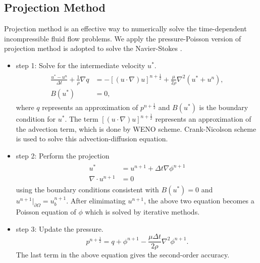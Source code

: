 \subsection{Projection Method}
Projection method is an effective way to numerically solve the time-dependent 
incompressible fluid flow problems. 
We apply the pressure-Poisson version of projection method 
\cite{Chorin68, KimMoin85, Brown2001accurate} is adopted to solve the 
Navier-Stokes . 
\begin{itemize}
\item step 1: Solve for the intermediate velocity $u^*$.
    \begin{eqnarray}
    \begin{aligned}
    \frac{u^* - u^n}{\Delta t} + \frac{1}{\rho} \nabla q &= -[(u \cdot \nabla) u]^{n + \frac{1}{2}} + \frac{\mu}{2\rho} \nabla^2 (u^* + u^n), \\
    B(u^{*}) &= 0, 
    \end{aligned}
    \label{eqn:projection_1}
    \end{eqnarray}
    where $q$ represents an approximation of $p^{n+\frac{1}{2}}$ and 
    $B(u^{*})$ is the boundary condition for $u^{*}$. 
    The term $[(u \cdot \nabla) u]^{n + \frac{1}{2}}$ represents an 
    approximation of the advection term, which is done by WENO scheme. 
    Crank-Nicolson scheme is used to solve this advection-diffusion equation. 
\item step 2: Perform the projection
    \begin{eqnarray}
    \begin{aligned}
    u^* &= u^{n+1} + \Delta t \nabla \phi^{n+1} \\
    \nabla \cdot u^{n+1} &= 0
    \end{aligned}
    \label{eqn:projection_2}
    \end{eqnarray}
    using the boundary conditions consistent with $B(u^{*}) = 0$ and 
    $u^{n+1}|_{\partial \Omega} = u^{n+1}_{b}$. 
    After elimimating $u^{n+1}$, the above two equation becomes a Poisson 
    equation of $\phi$ which is solved by iterative methods. 
\item step 3: Update the pressure.
    \begin{equation}
    p^{n+\frac{1}{2}} = q + \phi^{n+1} - \frac{\mu \Delta t}{2\rho} \nabla^2 \phi^{n+1}.
    \label{eqn:projection_3}
    \end{equation}
    The last term in the above equation gives the second-order accuracy. 
\end{itemize}



